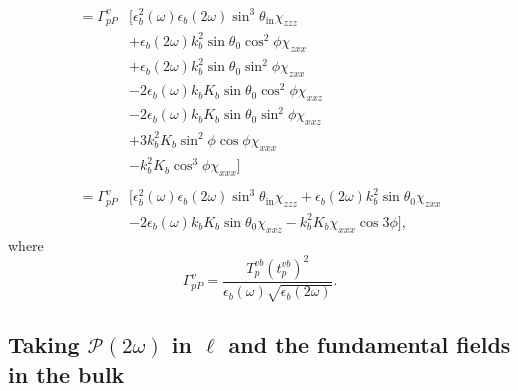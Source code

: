 \begin{equation*}
\begin{split}
= \Gamma^{v}_{pP}&\big[
    \epsilon^{2}_{b}(\omega)\epsilon_{b}
    (2\omega)\sin^{3}\theta_{\mathrm{in}}\chi_{zzz}\\
&+  \epsilon_{b}(2\omega)k^{2}_{b}
    \sin\theta_{0}\cos^{2}\phi\chi_{zxx}\\
&+  \epsilon_{b}(2\omega)k^{2}_{b}
    \sin\theta_{0}\sin^{2}\phi\chi_{zxx}\\
&- 2\epsilon_{b}(\omega)k_{b}K_{b}
    \sin\theta_{0}\cos^{2}\phi\chi_{xxz}\\
&- 2\epsilon_{b}(\omega)k_{b}K_{b}
    \sin\theta_{0}\sin^{2}\phi\chi_{xxz}\\
&+ 3k^{2}_{b}K_{b}\sin^{2}\phi\cos\phi\chi_{xxx}\\
&-  k^{2}_{b}K_{b}\cos^{3}\phi\chi_{xxx}
\big]\\\\
= \Gamma^{v}_{pP}&\big[
    \epsilon^{2}_{b}(\omega)\epsilon_{b}(2\omega)
    \sin^{3}\theta_{\mathrm{in}}\chi_{zzz}
 +  \epsilon_{b}(2\omega)k^{2}_{b}\sin\theta_{0}\chi_{zxx}\\
&- 2\epsilon_{b}(\omega)k_{b}K_{b}\sin\theta_{0}\chi_{xxz}
 -  k^{2}_{b}K_{b}\chi_{xxx}\cos3\phi
\big],
\end{split}
\end{equation*}
where
\begin{equation*}
\Gamma^{v}_{pP} =
\frac{T^{v b}_{p}\left(t^{v b}_{p}\right)^{2}}
     {\epsilon_{b}(\omega)\sqrt{\epsilon_{b}(2\omega)}}.
\end{equation*}


\subsection{Taking \texorpdfstring{$\mathcal{P}(2\omega)$}{P(2w)} in
\texorpdfstring{$\ell$}{l} and the fundamental fields in the bulk}

